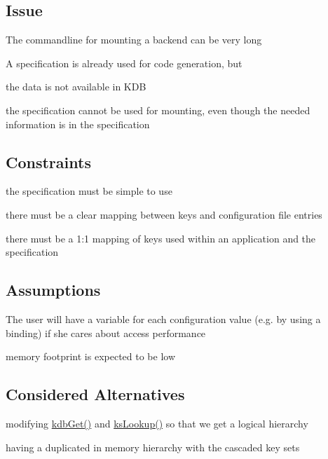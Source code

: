 \subsection*{Issue}


\begin{DoxyItemize}
\item The commandline for mounting a backend can be very long
\item A specification is already used for code generation, but
\begin{DoxyItemize}
\item the data is not available in K\+DB
\item the specification cannot be used for mounting, even though the needed information is in the specification
\end{DoxyItemize}
\end{DoxyItemize}

\subsection*{Constraints}


\begin{DoxyItemize}
\item the specification must be simple to use
\item there must be a clear mapping between keys and configuration file entries
\item there must be a 1\+:1 mapping of keys used within an application and the specification
\end{DoxyItemize}

\subsection*{Assumptions}


\begin{DoxyItemize}
\item The user will have a variable for each configuration value (e.\+g. by using a binding) if she cares about access performance
\item memory footprint is expected to be low
\end{DoxyItemize}

\subsection*{Considered Alternatives}


\begin{DoxyItemize}
\item modifying \hyperlink{group__kdb_ga28e385fd9cb7ccfe0b2f1ed2f62453a1}{kdb\+Get()} and \hyperlink{group__keyset_gaa34fc43a081e6b01e4120daa6c112004}{ks\+Lookup()} so that we get a logical hierarchy
\item having a duplicated in memory hierarchy with the cascaded key sets
\end{DoxyItemize}

